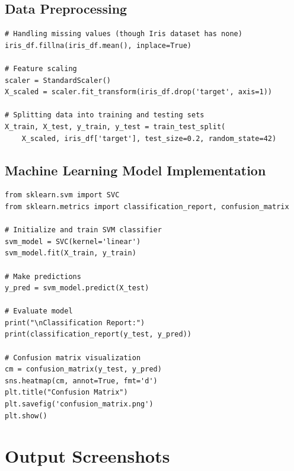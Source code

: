 \documentclass{article}
\begin{document}
\subsection{Data Preprocessing}
\begin{verbatim}
# Handling missing values (though Iris dataset has none)
iris_df.fillna(iris_df.mean(), inplace=True)

# Feature scaling
scaler = StandardScaler()
X_scaled = scaler.fit_transform(iris_df.drop('target', axis=1))

# Splitting data into training and testing sets
X_train, X_test, y_train, y_test = train_test_split(
    X_scaled, iris_df['target'], test_size=0.2, random_state=42)
\end{verbatim}

\subsection{Machine Learning Model Implementation}
\begin{verbatim}
from sklearn.svm import SVC
from sklearn.metrics import classification_report, confusion_matrix

# Initialize and train SVM classifier
svm_model = SVC(kernel='linear')
svm_model.fit(X_train, y_train)

# Make predictions
y_pred = svm_model.predict(X_test)

# Evaluate model
print("\nClassification Report:")
print(classification_report(y_test, y_pred))

# Confusion matrix visualization
cm = confusion_matrix(y_test, y_pred)
sns.heatmap(cm, annot=True, fmt='d')
plt.title("Confusion Matrix")
plt.savefig('confusion_matrix.png')
plt.show()
\end{verbatim}

\section{Output Screenshots}
\end{document}
